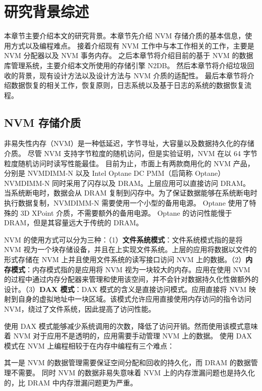 
\chapter{研究背景综述}

本章节主要介绍本文的研究背景。本章节先介绍 NVM 存储介质的基本信息，使用方式以及编程难点。
接着介绍现有 NVM 工作中与本工作相关的工作，主要是 NVM 分配器以及 NVM 事务内存。
之后本章节将介绍目前的基于 NVM 的数据库管理系统，主要介绍本文所使用的存储引擎 N2DB。
然后本章节将介绍垃圾回收的背景，现有设计方法以及设计方法与 NVM 介质的适配性。
最后本章节将介绍数据恢复的相关工作，恢复原则，日志系统以及基于日志的系统的数据恢复流程。

\section{NVM 存储介质}

非易失性内存（NVM）是一种低延迟，字节寻址，大容量以及数据持久化的存储介质。
尽管 NVM 支持字节粒度的随机访问，但是实验证明，NVM 在以 64 字节粒度随机访问时读写性能最佳。
目前为止，市面上有两款商用化的 NVM 产品，分别是 NVMDIMM-N 以及 Intel Optane DC PMM（后简称 Optane）
NVMDIMM-N 同时采用了闪存以及 DRAM。上层应用可以直接访问 DRAM。
当系统断电时，数据会从 DRAM 复制到闪存中。为了保证数据能够在系统断电时执行数据复制，NVMDIMM-N 需要使用一个小型的备用电源。
Optane 使用了特殊的 3D XPoint 介质，不需要额外的备用电源。
Optane 的访问性能慢于 DRAM，但是其容量远大于传统的 DRAM。


NVM 的使用方式可以分为三种：（1）\textbf{文件系统模式}：文件系统模式指的是将 NVM 视为一个块存储设备，并且在上实现文件系统。上层的应用将数据以文件的形式存储在 NVM 上并且使用文件系统的读写接口访问 NVM 上的数据。（2）\textbf{内存模式}：内存模式指的是应用将 NVM 视为一块较大的内存。应用在使用 NVM 的过程中通过内存分配器来管理和使用该空间，并不会针对数据持久化性做额外的设计。（3）\textbf{DAX 模式}：DAX 模式的含义是直接访问模式。应用直接将 NVM 映射到自身的虚拟地址中一块区域。该模式允许应用直接使用内存访问的指令访问 NVM，绕过了文件系统，因此提高了访问性能。

使用 DAX 模式能够减少系统调用的次数，降低了访问开销。然而使用该模式意味着 NVM 对于应用不是透明的，应用需要手动管理 NVM 上的数据。
使用 DAX 模式在 NVM 上编程相较于在内存中编程有三个难点：

其一是 NVM 的数据管理需要保证空间分配和回收的持久化，而 DRAM 的数据管理不需要。
同时 NVM 的数据非易失意味着 NVM 上的内存泄漏问题也是持久化的，比 DRAM 中内存泄漏问题更为严重。

